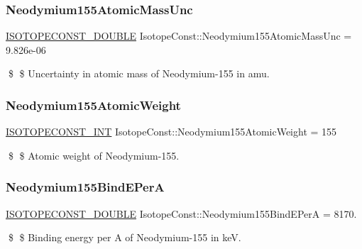 \subsubsection{\texorpdfstring{Neodymium155\+Atomic\+Mass\+Unc}{Neodymium155AtomicMassUnc}}
{\footnotesize\ttfamily \mbox{\hyperlink{group___isotope_const-_macros_ga8f45a7272ce02c0b4c65c44636ed719a}{I\+S\+O\+T\+O\+P\+E\+C\+O\+N\+S\+T\+\_\+\+D\+O\+U\+B\+LE}} Isotope\+Const\+::\+Neodymium155\+Atomic\+Mass\+Unc = 9.\+826e-\/06}

\$ \$ Uncertainty in atomic mass of Neodymium-\/155 in amu. \mbox{\label{group___isotope_const-_neodymium-_nd155_ga685e4e812e3f5e49de0dabec890e9cb9}} 
\subsubsection{\texorpdfstring{Neodymium155\+Atomic\+Weight}{Neodymium155AtomicWeight}}
{\footnotesize\ttfamily \mbox{\hyperlink{group___isotope_const-_macros_ga5f18360b3e99483a35c32d789e62621c}{I\+S\+O\+T\+O\+P\+E\+C\+O\+N\+S\+T\+\_\+\+I\+NT}} Isotope\+Const\+::\+Neodymium155\+Atomic\+Weight = 155}

\$ \$ Atomic weight of Neodymium-\/155. \mbox{\label{group___isotope_const-_neodymium-_nd155_ga9ffa27e9ea73a1ad99f921c068437e2a}} 
\subsubsection{\texorpdfstring{Neodymium155\+Bind\+E\+PerA}{Neodymium155BindEPerA}}
{\footnotesize\ttfamily \mbox{\hyperlink{group___isotope_const-_macros_ga8f45a7272ce02c0b4c65c44636ed719a}{I\+S\+O\+T\+O\+P\+E\+C\+O\+N\+S\+T\+\_\+\+D\+O\+U\+B\+LE}} Isotope\+Const\+::\+Neodymium155\+Bind\+E\+PerA = 8170.}

\$ \$ Binding energy per A of Neodymium-\/155 in keV. \mbox{\label{group___isotope_const-_neodymium-_nd155_ga14881130656f493553547f21db477f0a}} 
